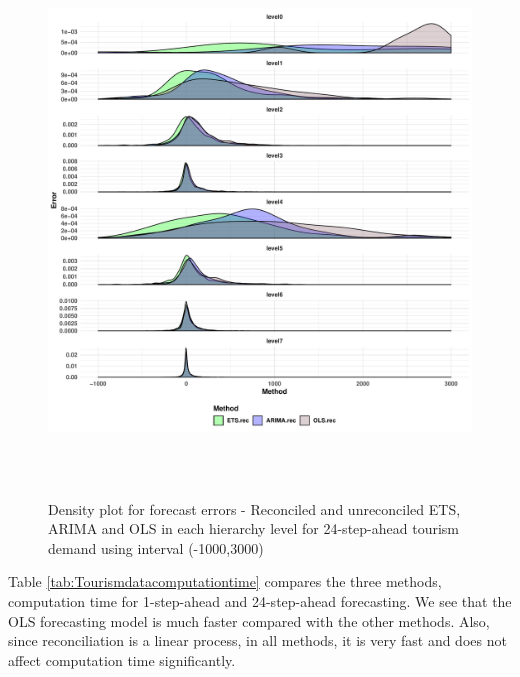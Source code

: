 \documentclass[11pt,a4paper,]{article}
\begin{document}
\begin{figure}

{\centering \includegraphics[width=450px,height=550px]{Paper-Figures/results_Tourism/densityplot_24} 

}

\caption{Density plot for forecast errors - Reconciled and unreconciled ETS, ARIMA and OLS in each hierarchy level for 24-step-ahead tourism demand using interval (-1000,3000)}\label{fig:densityplottourism}
\end{figure}

Table \ref{tab:Tourismdatacomputationtime} compares the three methods, computation time for 1-step-ahead and 24-step-ahead forecasting. We see that the OLS forecasting model is much faster compared with the other methods. Also, since reconciliation is a linear process, in all methods, it is very fast and does not affect computation time significantly.
\end{document}
